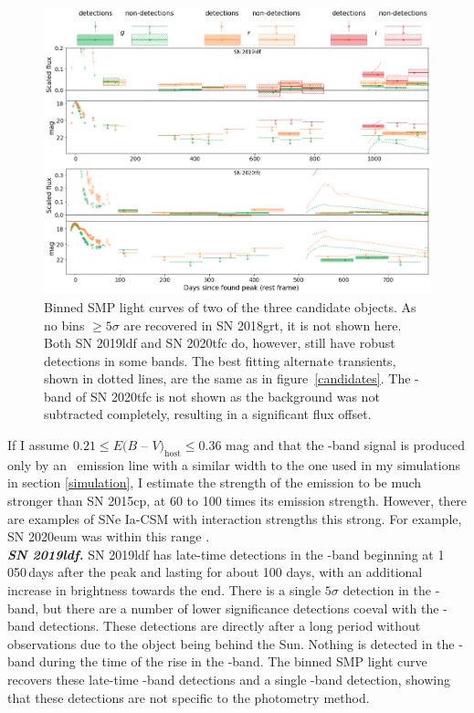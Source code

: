 \documentclass[a4paper,oneside,12pt, class=Latex/Classes/PhDthesisPSnPDF, crop=false]{standalone}
\begin{document}
\begin{figure}
 \centering
 \includegraphics[width=\textwidth]{../Images/chapter_3/candid_plots_smp.png}
 \caption[Binned SMP light curves of two of the three candidate objects.]{Binned SMP light curves of two of the three candidate objects. As no bins $\geq5\sigma$ are recovered in SN 2018grt, it is not shown here. Both SN 2019ldf and SN 2020tfc do, however, still have robust detections in some bands. The best fitting alternate transients, shown in dotted lines, are the same as in figure~\ref{candidates}. The \ztfi-band of SN 2020tfc is not shown as the background was not subtracted completely, resulting in a significant flux offset.}
 \label{final_candid_SMP}
\end{figure}

If I assume $0.21 \leq E(B$ -- $V)_\text{host} \leq 0.36$ mag and that the \ztfr-band signal is produced only by an \Halpha~emission line with a similar width to the one used in my simulations in section \ref{simulation}, I estimate the strength of the emission to be much stronger than SN 2015cp, at 60 to 100 times its emission strength. However, there are examples of SNe Ia-CSM with interaction strengths this strong. For example, SN 2020eum was within this range \citep{Ia-CSM_BTS}.\\


\textit{\textbf{SN 2019ldf.}}
SN 2019ldf has late-time detections in the \ztfr-band beginning at 1\,050\,days after the peak and lasting for about 100 days, with an additional increase in brightness towards the end. There is a single $5\sigma$ detection in the \ztfi-band, but there are a number of lower significance detections coeval with the \ztfr-band detections. These detections are directly after a long period without observations due to the object being behind the Sun. Nothing is detected in the \ztfg-band during the time of the rise in the \ztfr-band. The binned SMP light curve recovers these late-time \ztfr-band detections and a single \ztfi-band detection, showing that these detections are not specific to the photometry method.
\end{document}
